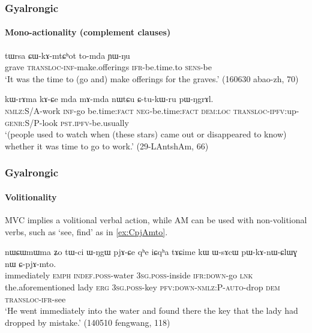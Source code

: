 \documentclass[xcolor=table]{beamer}
\newcommand{\bleu}[1]{{\color{blue}#1}}
\newcommand{\rouge}[1]{{\color{red}#1}}
\begin{document}
  \begin{frame} 
\frametitle{Gyalrongic}
 \framesubtitle{Mono-actionality (complement clauses)}
\begin{exe}
\ex \label{ex:CWkAmtChot}
\gll tɯrsa \rouge{ɕɯ}-kɤ-mtɕʰot to-mda ɲɯ-ŋu \\
grave \rouge{\textsc{transloc}}-\textsc{inf}-make.offerings \textsc{ifr}-be.time.to \textsc{sens}-be \\
\glt `It was the time to (\rouge{go} and) make offerings for the graves.' (160630 abao-zh, 70)
 \end{exe} 

 \begin{exe}
\ex \label{ex:kWrAma.kACe}
\gll   kɯ-rɤma kɤ-\bleu{ɕe} mda mɤ-mda nɯtɕu ɕ-tu-kɯ-ru pɯ-ŋgrɤl. \\
 \textsc{nmlz}:S/A-work \textsc{inf}-\bleu{go} be.time:\textsc{fact} \textsc{neg}-be.time:\textsc{fact} \textsc{dem}:\textsc{loc} \textsc{transloc}-\textsc{ipfv}:up-\textsc{genr}:S/P-look \textsc{pst}.\textsc{ipfv}-be.usually \\
 \glt  `(people used to watch when (these stars) came out or disappeared to know) whether it was time to \bleu{go} to work.' (29-LAntshAm, 66)
  \end{exe}
    \end{frame}  
    \begin{frame} 
\frametitle{Gyalrongic}
 \framesubtitle{Volitionality}
MVC implies a volitional verbal action, while AM can be used with non-volitional verbs, such as `see, find' as in \ref{ex:CpjAmto}.

  \begin{exe}
\ex  \label{ex:CpjAmto}
\gll  nɯɕɯmɯma ʑo tɯ-ci ɯ-ŋgɯ pjɤ-ɕe qʰe iɕqʰa tɤɕime kɯ ɯ-sɤcɯ pɯ-kɤ-nɯ-ɕlɯɣ nɯ \rouge{ɕ}-pjɤ-mto. \\
immediately \textsc{emph} \textsc{indef}.\textsc{poss}-water \textsc{3sg}.\textsc{poss}-inside \textsc{ifr}:\textsc{down}-go \textsc{lnk} the.aforementioned lady \textsc{erg} \textsc{3sg}.\textsc{poss}-key \textsc{pfv}:\textsc{down}-\textsc{nmlz}:P-\textsc{auto}-drop \textsc{dem} \rouge{\textsc{transloc}}-\textsc{ifr}-see \\
\glt `He went immediately into the water and found there the key that the lady had dropped by mistake.' (140510 fengwang, 118)
\end{exe}
  \end{frame}  
  
\end{document}
